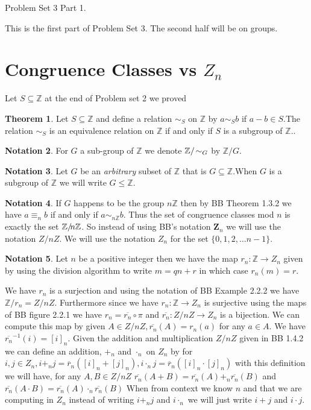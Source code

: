 \documentclass[12pt]{amsart}
\theoremstyle{definition}
\newtheorem{theorem}{Theorem}
\newtheorem{notation}[theorem]{Notation}
\newcommand{\bnot}{\begin{notation}}
\newcommand{\enot}{\end{notation}}
\newcommand{\bet}{\begin{theorem}}
\newcommand{\et}{\end{theorem}}
\newcommand{\mbZ}{\mathbb{Z}}
\newcommand{\nts}{\negthinspace}
\begin{document}
 
\begin{center} Problem Set 3 Part 1.
\end{center}
This is the first part of Problem Set 3. The second half will be on groups.

\section{Congruence Classes vs $Z_n$}
 Let $S\subseteq \mbZ$
 at the end of Problem set 2 we proved 
\bet  \label{groupequiv} Let $S\subseteq \mbZ$ and define a relation $\sim_S$ on $\mbZ$ by $a\sim_S b$ if $a-b\in S$.The relation $\sim_S$ is an equivalence relation on $\mbZ$ if and only if $S$ is a subgroup of $\mbZ$..
\et
\bnot For $G$ a sub-group of $\mbZ$ we denote $\mbZ/\nts\sim_G$ by $\mbZ/G$.
\enot
\bnot Let $G$ be an {\em arbitrary} subset of $\mbZ$ that is $G\subseteq \mbZ$.When $G$ is a subgroup of $\mbZ$ we will write $G\leq \mbZ$.
\enot

\bnot If $G$ happens to be the group $n\mbZ$ then  by BB Theorem 1.3.2 we have $a\equiv_n b$ if and only if $a\sim_{n\mbZ} b$. Thus the set of congruence classes mod $n$ is exactly the set $\mbZ/\nts n\mbZ$. So instead of using BB's 
notation $\bm{Z}_n$ we will use the notation $Z/nZ$. We will use the notation $Z_n$ for the set $\{0,1,2,\dots n-1\}$. 
\enot
\bnot Let $n$ be a positive integer then we have the map $r_n\colon \mbZ\to Z_n$ given by using the division algorithm to write $m=qn+r$ in which case $r_n(m)=r$. 
\enot
We have $r_n$ is a surjection and using the notation of BB Example 2.2.2 we have $\mbZ/r_n=Z/nZ$. Furthermore  since we have $r_n\colon \mbZ\to Z_n$ is surjective using the maps of  BB figure 2.2.1 we have $r_n=\overline{r_n}\circ\pi$
and  $\overline{r_n}\colon Z/nZ\to Z_n$ is a bijection. We can compute this map by given $A\in Z/nZ,\overline{r_n}(A)=r_n(a)$ for any $a\in A$. We have $\overline{r_n}^{-1}(i)=[i]_n$. Given the addition and multiplication $Z/nZ$ given in BB 
1.4.2 we can define an addition, $+_n$ and $\cdot_n$  on $Z_n$ by for $i,j\in Z_n, i+_n j=\overline{r}_n([i]_n+[j]_n), i\cdot_n j=\overline{r}_n([i]_n\cdot  [j]_n)$ with this definition we will have, for any $A,B\in Z/nZ$ $\overline{r_n}(A+B)=\overline{r_n}(A)+_n\overline{r_n}(B)$
and $\overline{r_n}(A\cdot B)=\overline{r_n}(A)\cdot_n\overline{r_n}(B)$ When from context we know $n$ and that we are computing in $Z_n$ instead of writing $i+_nj$ and $i\cdot_n$ we will just write $i+j$ and $i\cdot j$.
\end{document}
